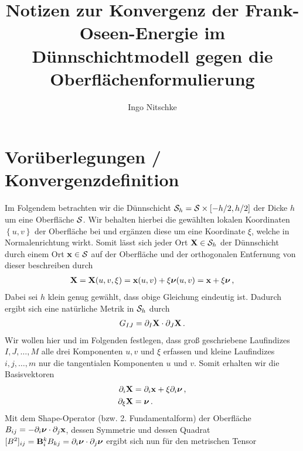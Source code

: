 \documentclass[a4paper,11pt]{scrartcl}
\title{Notizen zur Konvergenz der Frank-Oseen-Energie im Dünnschichtmodell gegen die Oberflächenformulierung}
\author{Ingo Nitschke}
\newcommand{\surfh}{\surf_{h}}
\begin{document}
\maketitle

\section{Vorüberlegungen / Konvergenzdefinition}

Im Folgendem betrachten wir die Dünnschicht \( \surfh = \surf \times \left[ -h/2 , h/2 \right] \) 
der Dicke \( h \) um eine Oberfläche \( \mathcal{S} \).
Wir behalten hierbei die gewählten lokalen Koordinaten \( \left\{ u,v \right\} \) der Oberfläche bei und ergänzen diese um eine Koordinate
\( \xi \), welche in Normalenrichtung wirkt.
Somit lässt sich jeder Ort \( \Xb\in\surfh \) der Dünnschicht durch einem Ort \( \mathbf{x}\in\mathcal{S} \) auf der Oberfläche und der orthogonalen Entfernung von
dieser beschreiben durch
\begin{align}
  \mathbf{X} = \mathbf{X}(u,v,\xi) = \mathbf{x}(u,v) + \xi\boldsymbol{\nu}(u,v) = \mathbf{x} + \xi\boldsymbol{\nu} \,\text{,}
\end{align}
Dabei sei \( h \) klein genug gewählt, dass obige Gleichung eindeutig ist. 
Dadurch ergibt sich eine natürliche Metrik in \( \surfh \) durch
\begin{align}
  G_{IJ} = \partial_{I}\mathbf{X} \cdot \partial_{J}\mathbf{X} \,\text{.}
\end{align}
Wir wollen hier und im Folgenden festlegen, dass groß geschriebene Laufindizes \( I,J,\ldots,M \) alle drei Komponenten \( u,v \) und \(
\xi\) erfassen und kleine Laufindizes \( i,j,\ldots,m \) nur die tangentialen Komponenten \( u \) und \( v \).
Somit erhalten wir die Basisvektoren
\begin{align}
  \partial_{i}\mathbf{X} &= \partial_{i}\mathbf{x} + \xi\partial_{i}\boldsymbol{\nu} \,\text{,} \\
  \partial_{\xi}\mathbf{X} &= \boldsymbol{\nu} \,\text{.}
\end{align}
Mit dem Shape-Operator (bzw. 2. Fundamentalform) der Oberfläche \( B_{ij} = -\partial_{i}\boldsymbol{\nu}\cdot\partial_{j}\mathbf{x} \),
dessen Symmetrie und dessen Quadrat \( [B^{2}]_{ij} = \mathbf{B}{_{i}^{k}}B_{kj} =  \partial_{i}\boldsymbol{\nu}\cdot\partial_{j}\boldsymbol{\nu}\)
ergibt sich nun für den metrischen Tensor
\end{document}

